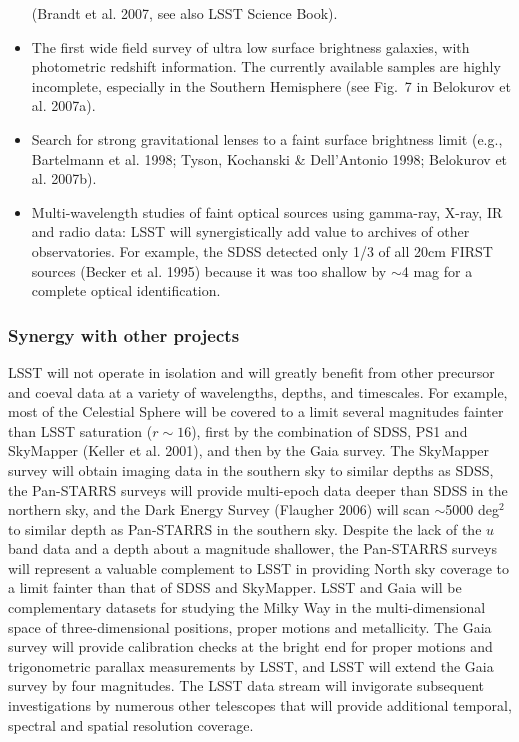 \documentclass{emulateapj}
\newcommand{\B}[1]{{#1}}
\begin{document}
\begin{itemize}
      (Brandt et al. 2007, see also LSST Science Book).
\item The first wide field survey of ultra low surface brightness galaxies, with 
      photometric redshift information. The currently available samples are highly
      incomplete, especially in the Southern Hemisphere (see Fig.~7 in Belokurov et al. 2007a). 
\item Search for strong gravitational lenses to a faint surface brightness limit (e.g., 
      Bartelmann et al. 1998; Tyson, Kochanski \& Dell'Antonio 1998; Belokurov et al. 2007b).
\item Multi-wavelength studies of faint optical sources using gamma-ray, X-ray, IR and
      radio data: \B{LSST will synergistically add value to archives of other observatories.}
      For example, the SDSS detected only 1/3 of all 20cm FIRST sources 
      (Becker et al. 1995) because it was too shallow by $\sim$4 mag for a complete 
      optical identification. 
\end{itemize}


\subsubsection{  Synergy with other projects }

LSST will not operate in isolation and will greatly benefit from other precursor and coeval 
data at a variety of wavelengths, depths, and timescales. For example, most of the Celestial 
Sphere will be covered to a limit several magnitudes fainter than LSST saturation 
($r\sim16$), first by the combination of SDSS, PS1 and SkyMapper (Keller et al. 2001), 
and then by the Gaia survey. The SkyMapper survey will obtain imaging data in the southern
sky to similar depths as SDSS, the Pan-STARRS surveys will provide multi-epoch data deeper 
than SDSS in the northern sky, and the Dark Energy Survey (Flaugher 2006) will scan 
$\sim$5000 deg$^2$ to similar depth as Pan-STARRS in the southern sky. Despite the lack of 
the $u$ band data and a depth about a magnitude shallower, the Pan-STARRS surveys
will represent a valuable complement to LSST in providing North sky coverage to a limit 
fainter than that of SDSS and SkyMapper. LSST and Gaia will 
be complementary datasets for studying the Milky Way in the multi-dimensional space of 
three-dimensional positions, proper motions and 
metallicity. The Gaia survey will provide calibration checks at the bright end for proper 
motions and trigonometric parallax measurements by LSST, and LSST will extend the 
Gaia survey by four magnitudes. The LSST data stream will invigorate subsequent 
investigations by numerous other telescopes that will provide 
additional temporal, spectral and spatial resolution coverage. 
\end{document}
